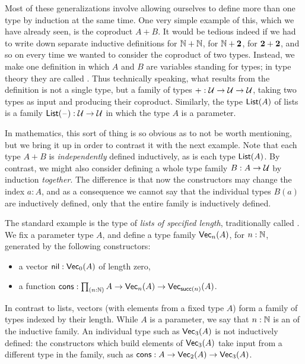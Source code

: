 Most of these generalizations involve allowing ourselves to define more than one type by induction at the same time.
One very simple example of this, which we have already seen, is the coproduct $A+B$.
It would be tedious indeed if we had to write down separate inductive definitions for $\mathbb{N}+\mathbb{N}$, for $\mathbb{N}+\mathbf{2}$, for $\mathbf{2}+\mathbf{2}$, and so on every time we wanted to consider the coproduct of two types.
Instead, we make one definition in which $A$ and $B$ are variables standing for types;
%
in type theory they are called .%
Thus technically speaking, what results from the definition is not a single type, but a family of types $+ : \mathcal{U}\to\mathcal{U}\to\mathcal{U}$, taking two types as input and producing their coproduct.
Similarly, the type $\mathsf{List}(A)$ of lists is a family $\mathsf{List}(\mathord{\hspace{1pt}\text{--}\hspace{1pt}}):\mathcal{U}\to\mathcal{U}$ in which the type $A$ is a parameter.

In mathematics, this sort of thing is so obvious as to not be worth mentioning, but we bring it up in order to contrast it with the next example.
Note that each type $A+B$ is \emph{independently} defined inductively, as is each type $\mathsf{List}(A)$.
%
%
By contrast, we might also consider defining a whole type family $B:A\to\mathcal{U}$ by induction \emph{together}.
The difference is that now the constructors may change the index $a:A$, and as a consequence we cannot say that the individual types $B(a)$ are inductively defined, only that the entire family is inductively defined.

%
%
The standard example is the type of \emph{lists of specified length}, traditionally called .
We fix a parameter type $A$, and define a type family $\mathsf{Vec}_{n}(A)$, for $n:\mathbb{N}$, generated by the following constructors:
\begin{itemize}
\item a vector $\mathsf{nil}:\mathsf{Vec}_{0}(A)$ of length zero,
\item a function $\cons:\prd{n:\nat} A\to \vect n A \to \vect{\suc (n)} A$.
\end{itemize}
In contrast to lists, vectors (with elements from a fixed type $A$) form a family of types indexed by their length.
While $A$ is a parameter, we say that $n:\mathbb{N}$ is an 
%
of the inductive family.
An individual type such as $\mathsf{Vec}_{3}(A)$ is not inductively defined: the constructors which build elements of $\mathsf{Vec}_{3}(A)$ take input from a different type in the family, such as $\mathsf{cons}:A \to \mathsf{Vec}_{2}(A) \to \mathsf{Vec}_{3}(A)$.

